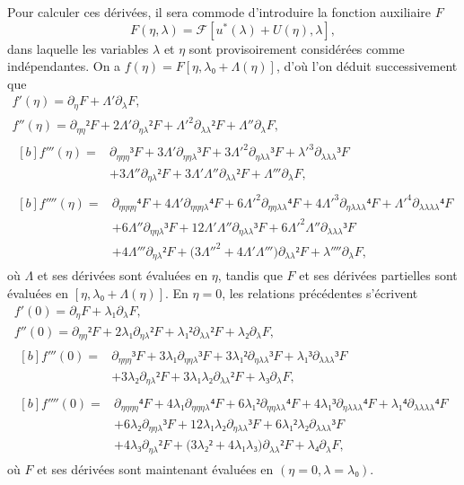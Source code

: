 \documentclass[12pt, final]{scrartcl}
\theoremstyle{definition}
\begin{document}
Pour calculer ces dérivées, il sera commode d'introduire la fonction auxiliaire
\(F\)
\begin{equation*}
  F(η, λ) =\mathcal{F}[u^{\ast}(λ) + U(η), λ],
\end{equation*}
dans laquelle les variables \(λ\) et \(η\) sont provisoirement considérées comme
indépendantes. On a \(f(η) = F[η, λ₀ + Λ(η)]\), d'où l'on déduit successivement
que
\begin{gather*}
  f'(η) = ∂_{η} F + Λ' ∂_{λ} F,\\
  f''(η) = ∂_{ηη}² F + 2Λ' ∂_{ηλ}²F + Λ'^2 ∂_{λλ}² F + Λ'' ∂_{λ} F,\\
  \begin{aligned}[b]
    f'''(η) ={}
    & ∂_{ηηη}³ F + 3Λ' ∂_{ηηλ}³F + 3Λ'^2 ∂_{ηλλ}³F + λ'^3 ∂_{λλλ}³ F\\
    & + 3Λ'' ∂_{ηλ}² F + 3Λ' Λ'' ∂_{λ λ}² F + Λ''' ∂_{λ} F,
  \end{aligned}\\
  \begin{aligned}[b]
    f''''(η) ={}
    & ∂_{ηηηη}⁴ F + 4Λ' ∂_{ηηηλ}⁴F + 6Λ'^2 ∂_{ηηλλ}⁴F + 4Λ'^3 ∂_{ηλλλ}⁴F + Λ'^4 ∂_{λλλλ}⁴ F\\
    & + 6Λ'' ∂_{ηηλ}³ F + 12Λ' Λ'' ∂_{ηλλ}³F + 6Λ'^2 Λ'' ∂_{λλλ}³ F\\
    & + 4 Λ''' ∂_{ηλ}² F + \bigl( 3Λ''^2 + 4 Λ' Λ''' \bigr) ∂_{λλ}² F + λ'''' ∂_{λ}F,
  \end{aligned}
\end{gather*}
où \(Λ\) et ses dérivées sont évaluées en \(η\), tandis que \(F\) et ses
dérivées partielles sont évaluées en \([η, λ₀ + Λ(η)]\). En \(η = 0\), les
relations précédentes s'écrivent
\begin{gather}
  \label{eq:20220107060454}
  f'(0) = ∂_{η} F + λ₁ ∂_{λ} F,\\
  \label{eq:20220107124311}
  f''(0) = ∂_{ηη}² F + 2 λ₁ ∂_{ηλ}² F + λ₁² ∂_{λλ}² F + λ₂ ∂_{λ} F,\\
  \label{eq:20220107060500}
  \begin{aligned}[b]
    f'''(0) ={}
    & ∂_{ηηη}³ F + 3 λ₁ ∂_{ηηλ}³ F + 3 λ₁² ∂_{ηλλ}³ F + λ₁³ ∂_{λλλ}³ F\\
    & + 3 λ₂ ∂_{ηλ}² F + 3 λ₁ λ₂ ∂_{λλ}² F + λ₃ ∂_{λ} F,
  \end{aligned}\\
  \label{eq:20220602185935}
  \begin{aligned}[b]
    f''''(0) ={}
    & ∂_{ηηηη}⁴F + 4 λ₁ ∂_{ηηηλ}⁴ F + 6 λ₁² ∂_{ηηλλ}⁴ F + 4 λ₁³ ∂_{ηλλλ}⁴ F + λ₁⁴ ∂_{λλλλ}⁴ F\\
    & + 6 λ₂ ∂_{ηηλ}³ F + 12 λ₁ λ₂ ∂_{ηλλ}³ F + 6 λ₁² λ₂ ∂_{λλλ}³ F\\
    & + 4 λ₃ ∂_{ηλ}² F + \bigl(3 λ₂² + 4 λ₁ λ₃\bigr) ∂_{λλ}² F + λ₄ ∂_{λ} F,
  \end{aligned}
\end{gather}
où \(F\) et ses dérivées sont maintenant évaluées en \((η = 0, λ = λ₀)\).
\end{document}
